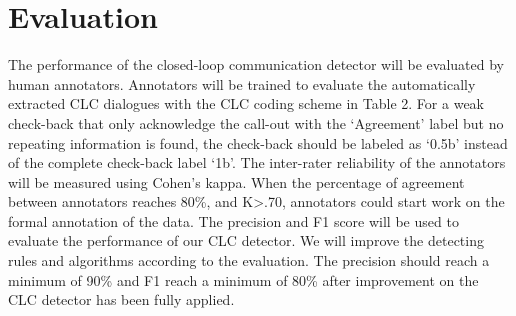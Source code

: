 \section{Evaluation}
The performance of the closed-loop communication detector will be evaluated by human annotators. Annotators will be trained to evaluate the automatically extracted CLC dialogues with the CLC coding scheme in Table 2. For a weak check-back that only acknowledge the call-out with the ‘Agreement’ label but no repeating information is found, the check-back should be labeled as ‘0.5b’ instead of the complete check-back label ‘1b’.
The inter-rater reliability of the annotators will be measured using Cohen’s kappa. When the percentage of agreement between annotators reaches 80\%, and K>.70, annotators could start work on the formal annotation of the data. The precision and F1 score will be used to evaluate the performance of our CLC detector. We will improve the detecting rules and algorithms according to the evaluation. The precision should reach a minimum of 90\% and F1 reach a minimum of 80\% after improvement on the CLC detector has been fully applied.


